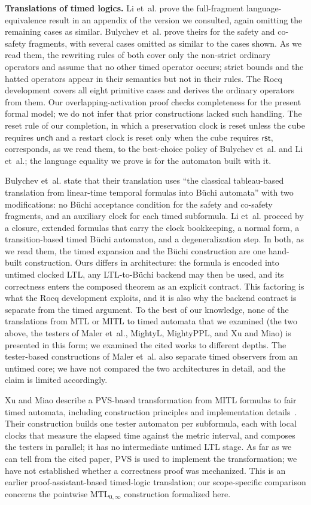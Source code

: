 \documentclass[manuscript]{acmart}
\providecommand{\Reset}{}\renewcommand{\Reset}{\mathsf{rst}}
\newcommand{\Unch}{\mathsf{unch}}
\newcommand{\runinhead}[1]{\par\noindent\textbf{#1}\enspace}
\begin{document}
\runinhead{Translations of timed logics.}
Li et~al. prove the full-fragment language-equivalence result in an appendix
of the version we consulted, again omitting the remaining cases as similar.
Bulychev et~al. prove theirs for the safety and co-safety
fragments, with several cases omitted as similar to the cases shown. As we read
them, the rewriting rules of both cover only the non-strict ordinary operators and assume that no other timed
operator occurs; strict bounds and the hatted operators appear in their
semantics but not in their rules.
The Rocq development covers all eight primitive cases and derives the ordinary
operators from them. Our overlapping-activation proof checks completeness for the present
formal model; we do not infer that prior constructions lacked such handling.
The reset rule of our completion, in which a preservation clock is reset unless
the cube requires $\Unch$ and a restart clock is reset only when the cube
requires $\Reset$, corresponds, as we read them, to the best-choice policy of Bulychev et~al.
and Li et~al.; the language equality we prove is for the automaton built with
it.

Bulychev et~al. state that their translation uses ``the classical
tableau-based translation from linear-time temporal formulas into B\"uchi
automata'' with two modifications: no B\"uchi acceptance condition for the
safety and co-safety fragments, and an auxiliary clock for each timed
subformula. Li et~al. proceed by a closure, extended formulas that carry the
clock bookkeeping, a normal form, a transition-based timed B\"uchi automaton,
and a degeneralization step. In both, as we read them, the timed expansion and the B\"uchi
construction are one hand-built construction. Ours differs in architecture:
the formula is encoded into untimed clocked LTL, any LTL-to-B\"uchi backend
may then be used, and its correctness enters the composed theorem as an
explicit contract. This factoring is what the Rocq development exploits, and
it is also why the backend contract is separate from the timed argument.
To the best of our knowledge, none of the translations from MTL or MITL to
timed automata that we examined (the two above, the testers of Maler et~al.,
MightyL, MightyPPL, and Xu and Miao) is presented in this form; we examined
the cited works to different depths. The tester-based constructions of Maler
et~al. also separate timed observers from an untimed core; we have not compared
the two architectures in detail, and the claim is limited accordingly.

Xu and Miao describe a PVS-based transformation from MITL formulas to fair
timed automata, including construction principles and implementation
details~\cite{xu08}. Their construction builds one tester automaton per
subformula, each with local clocks that measure the elapsed time against the
metric interval, and composes the testers in parallel; it has no intermediate
untimed LTL stage. As far as we can tell from the cited paper, PVS is used to implement the
transformation; we have not established whether a correctness proof was
mechanized. This is an earlier proof-assistant-based timed-logic translation;
our scope-specific comparison concerns the pointwise
MTL$_{0,\infty}$ construction formalized here.
\end{document}
